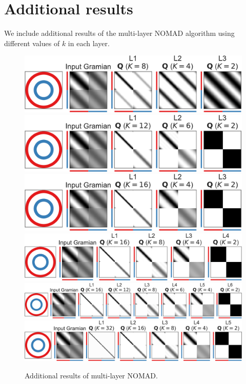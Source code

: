 \documentclass[twoside,11pt]{article}
\begin{document}
\section{Additional results}
\label{sec:additional_multilayer_results}

We include additional results of the multi-layer NOMAD algorithm using different values of $k$ in each layer.

\begin{figure}
	\includegraphics[width=.618\linewidth]{multilayer/circles-8-4-2}%
	\\[2pt]
	\includegraphics[width=.618\linewidth]{multilayer/circles-12-6-2}%
	\\[2pt]
	\includegraphics[width=.618\linewidth]{multilayer/circles-16-4-2}%
	\\[2pt]
	\includegraphics[width=.744\linewidth]{multilayer/circles-16-8-4-2}%
	\\[2pt]
	\includegraphics[width=\linewidth]{multilayer/circles-16-12-8-6-4-2}%
	\\[2pt]
	\includegraphics[width=.873\linewidth]{multilayer/circles-32-16-8-4-2}%
	\\[2pt]
	
	\caption{Additional results of multi-layer NOMAD.}
	\label{fig:additional_multilayer_rings}
\end{figure}
\end{document}
